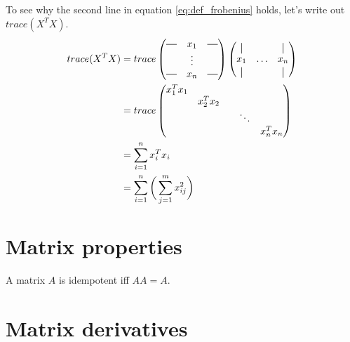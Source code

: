 To see why the second line in equation \ref{eq:def_frobenius}
holds, let's write out $trace(X^TX)$.
\begin{equation}
\begin{split}
trace(X^TX) &= trace
\begin{pmatrix}
\horzbar & x_1 & \horzbar\\
 & \vdots & \\
\horzbar & x_n & \horzbar\\
\end{pmatrix}
\begin{pmatrix}
\vertbar & & \vertbar\\
 x_1 & \hdots & x_n \\
\vertbar & & \vertbar\\
\end{pmatrix}\\
&= trace
\begin{pmatrix}
x_1^Tx_1 & & &\\
& x_2^Tx_2 & &\\
& & & \ddots &\\
& & & & x_n^Tx_n\\
\end{pmatrix}\\
&= \sum_{i = 1}^{n} x_i^Tx_i\\
&= \sum_{i = 1}^{n} \bigg( \sum_{j=1}^{m} x_{ij}^2 \bigg)
\end{split}
\end{equation}

\section*{Matrix properties}
\begin{defn}
A matrix $A$ is idempotent iff $AA = A$.
\end{defn}

\section*{Matrix derivatives}

